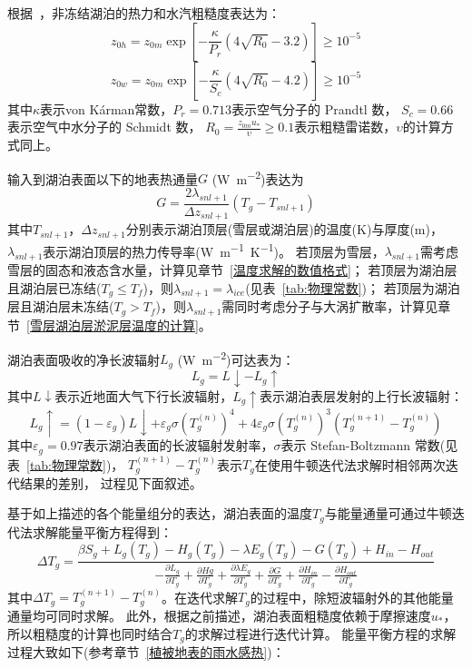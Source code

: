 根据~\citet{Zilitinkevich2001}，非冻结湖泊的热力和水汽粗糙度表达为：
\begin{equation}
z_{0 h}=z_{0 m} \exp \left[-\frac{\kappa}{P_{r}}\left(4 \sqrt{R_{0}}-3.2\right)\right] \geqslant 10^{-5}
\end{equation}
\begin{equation}
z_{0 w}=z_{0 m} \exp \left[-\frac{\kappa}{S_{c}}\left(4 \sqrt{R_{0}}-4.2\right)\right] \geqslant 10^{-5}
\end{equation}
其中$\kappa$表示von K\'arman常数，$P_r=0.713$表示空气分子的 Prandtl 数，
$S_c=0.66$表示空气中水分子的 Schmidt 数，
$R_0=\frac{z_{0m}u_\ast}{\upsilon}\geqslant0.1$表示粗糙雷诺数，$\upsilon$的计算方式同上。


输入到湖泊表面以下的地表热通量$G$ (\unit{W.m^{-2}})表达为
\begin{equation}
G=\frac{2 \lambda_{snl+1}}{\Delta z_{snl+1}}\left(T_{g}-T_{snl+1}\right)
\end{equation}
其中$T_{snl+1}$，$\Delta z_{snl+1}$分别表示湖泊顶层(雪层或湖泊层)的温度(K)与厚度(m)，
$\lambda_{snl+1}$表示湖泊顶层的热力传导率(\unit{W.m^{-1}.K^{-1}})。
若顶层为雪层，$\lambda_{snl+1}$需考虑雪层的固态和液态含水量，计算见章节~\ref{温度求解的数值格式}；
若顶层为湖泊层且湖泊层已冻结($T_g\leqslant T_f$)，则$\lambda_{snl+1}=\lambda_{ice}$(见表~\ref{tab:物理常数})；
若顶层为湖泊层且湖泊层未冻结($T_g>T_f$)，则$\lambda_{snl+1}$需同时考虑分子与大涡扩散率，计算见章节~\ref{雪层湖泊层淤泥层温度的计算}。


湖泊表面吸收的净长波辐射$L_g$ (\unit{W.m^{-2}})可达表为：
\begin{equation}
L_{g}=L \downarrow-L_{g} \uparrow
\end{equation}
其中$L\downarrow$表示近地面大气下行长波辐射，$L_g\uparrow$表示湖泊表层发射的上行长波辐射：
\begin{equation}
L_{g} \uparrow=\left(1-\varepsilon_{g}\right) L \downarrow+\varepsilon_{g} 
\sigma\left(T_{g}^{(n)}\right)^{4}+4 \varepsilon_{g} 
\sigma\left(T_{g}^{(n)}\right)^{3}\left(T_{g}^{(n+1)}-T_{g}^{(n)}\right)
\end{equation}
其中$\varepsilon_g=0.97$表示湖泊表面的长波辐射发射率，$\sigma$表示 Stefan-Boltzmann 常数(见表~\ref{tab:物理常数})，
$T_g^{\left(n+1\right)}-T_g^{\left(n\right)}$表示$T_g$在使用牛顿迭代法求解时相邻两次迭代结果的差别，
过程见下面叙述。


基于如上描述的各个能量组分的表达，湖泊表面的温度$T_g$与能量通量可通过牛顿迭代法求解能量平衡方程得到：
\begin{equation}
\Delta T_{g}=\frac{\beta S_{g}+L_{g}\left(T_{g}\right)-H_{g}\left(T_{g}\right)
-\lambda E_{g}\left(T_{g}\right)-G\left(T_{g}\right)+H_{in}-H_{out}}{-\frac{\partial L_{g}}{\partial T_{g}}
+\frac{\partial H g}{\partial T_{g}}+\frac{\partial \lambda E_{g}}{\partial T_{g}}+\frac{\partial G}{\partial T_{g}}+\frac{\partial H_{in}}{\partial T_{g}}-\frac{\partial H_{out}}{\partial T_{g}}}
\end{equation}
其中$\Delta T_g=T_g^{\left(n+1\right)}-T_g^{\left(n\right)}$。在迭代求解$T_g$的过程中，除短波辐射外的其他能量通量均可同时求解。
此外，根据之前描述，湖泊表面粗糙度依赖于摩擦速度$u_\ast$，所以粗糙度的计算也同时结合$T_g$的求解过程进行迭代计算。
能量平衡方程的求解过程大致如下(参考章节~\ref{植被地表的雨水感热})：

